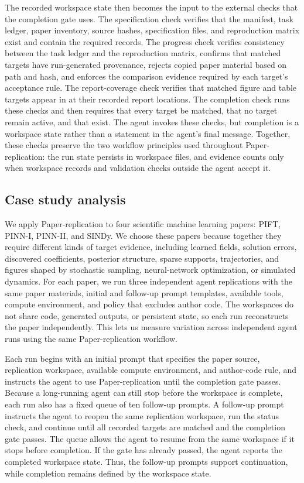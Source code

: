\documentclass[authoryear,5p,times,nopreprintline]{elsarticle}
\begin{document}
The recorded workspace state then becomes the input to the external checks that the completion gate uses.
The specification check verifies that the manifest, task ledger, paper inventory, source hashes, specification files, and reproduction matrix exist and contain the required records.
The progress check verifies consistency between the task ledger and the reproduction matrix, confirms that matched targets have run-generated provenance, rejects copied paper material based on path and hash, and enforces the comparison evidence required by each target's acceptance rule.
The report-coverage check verifies that matched figure and table targets appear in  at their recorded report locations.
The completion check runs these checks and then requires that every target be matched, that no target remain active, and that  exist.
The agent invokes these checks, but completion is a workspace state rather than a statement in the agent's final message.
Together, these checks preserve the two workflow principles used throughout Paper-replication: the run state persists in workspace files, and evidence counts only when workspace records and validation checks outside the agent accept it.

\subsection{Case study analysis}\label{sec:method_analysis}
We apply Paper-replication to four scientific machine learning papers: PIFT, PINN-I, PINN-II, and SINDy.
We choose these papers because together they require different kinds of target evidence, including learned fields, solution errors, discovered coefficients, posterior structure, sparse supports, trajectories, and figures shaped by stochastic sampling, neural-network optimization, or simulated dynamics.
For each paper, we run three independent agent replications with the same paper materials, initial and follow-up prompt templates, available tools, compute environment, and policy that excludes author code.
The workspaces do not share code, generated outputs, or persistent state, so each run reconstructs the paper independently.
This lets us measure variation across independent agent runs using the same Paper-replication workflow.

Each run begins with an initial prompt that specifies the paper source, replication workspace, available compute environment, and author-code rule, and instructs the agent to use Paper-replication until the completion gate passes.
Because a long-running agent can still stop before the workspace is complete, each run also has a fixed queue of ten follow-up prompts.
A follow-up prompt instructs the agent to reopen the same replication workspace, run the status check, and continue until all recorded targets are matched and the completion gate passes.
The queue allows the agent to resume from the same workspace if it stops before completion.
If the gate has already passed, the agent reports the completed workspace state.
Thus, the follow-up prompts support continuation, while completion remains defined by the workspace state.
\end{document}
